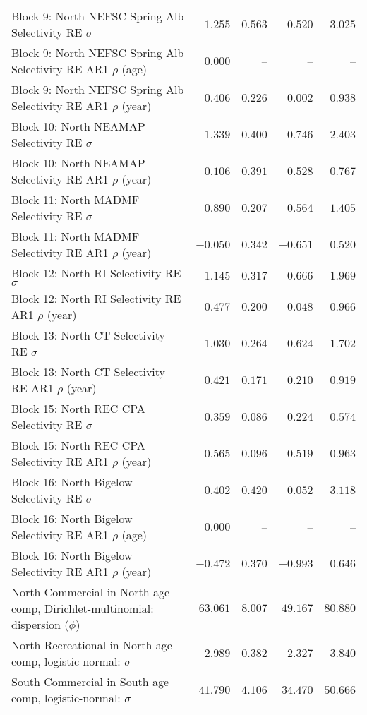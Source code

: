 \documentclass[
]{article}
\begin{document}
\begin{landscape}
\begin{longtable}[t]{lrrrr}
\addlinespace
Block 9: North NEFSC Spring Alb Selectivity RE $\sigma$ & $1.255$ & $0.563$ & $0.520$ & $3.025$\\
Block 9: North NEFSC Spring Alb Selectivity RE AR1 $\rho$ (age) & $0.000$ & -- & -- & --\\
Block 9: North NEFSC Spring Alb Selectivity RE AR1 $\rho$ (year) & $0.406$ & $0.226$ & $0.002$ & $0.938$\\
Block 10: North NEAMAP Selectivity RE $\sigma$ & $1.339$ & $0.400$ & $0.746$ & $2.403$\\
Block 10: North NEAMAP Selectivity RE AR1 $\rho$ (year) & $0.106$ & $0.391$ & $-0.528$ & $0.767$\\
\addlinespace
Block 11: North MADMF Selectivity RE $\sigma$ & $0.890$ & $0.207$ & $0.564$ & $1.405$\\
Block 11: North MADMF Selectivity RE AR1 $\rho$ (year) & $-0.050$ & $0.342$ & $-0.651$ & $0.520$\\
Block 12: North RI Selectivity RE $\sigma$ & $1.145$ & $0.317$ & $0.666$ & $1.969$\\
Block 12: North RI Selectivity RE AR1 $\rho$ (year) & $0.477$ & $0.200$ & $0.048$ & $0.966$\\
Block 13: North CT Selectivity RE $\sigma$ & $1.030$ & $0.264$ & $0.624$ & $1.702$\\
\addlinespace
Block 13: North CT Selectivity RE AR1 $\rho$ (year) & $0.421$ & $0.171$ & $0.210$ & $0.919$\\
Block 15: North REC CPA Selectivity RE $\sigma$ & $0.359$ & $0.086$ & $0.224$ & $0.574$\\
Block 15: North REC CPA Selectivity RE AR1 $\rho$ (year) & $0.565$ & $0.096$ & $0.519$ & $0.963$\\
Block 16: North Bigelow Selectivity RE $\sigma$ & $0.402$ & $0.420$ & $0.052$ & $3.118$\\
Block 16: North Bigelow Selectivity RE AR1 $\rho$ (age) & $0.000$ & -- & -- & --\\
\addlinespace
Block 16: North Bigelow Selectivity RE AR1 $\rho$ (year) & $-0.472$ & $0.370$ & $-0.993$ & $0.646$\\
North Commercial in North age comp, Dirichlet-multinomial: dispersion ($\phi$) & $63.061$ & $8.007$ & $49.167$ & $80.880$\\
North Recreational in North age comp, logistic-normal: $\sigma$ & $2.989$ & $0.382$ & $2.327$ & $3.840$\\
South Commercial in South age comp, logistic-normal: $\sigma$ & $41.790$ & $4.106$ & $34.470$ & $50.666$\\

\end{longtable}
\end{landscape}
\end{document}
